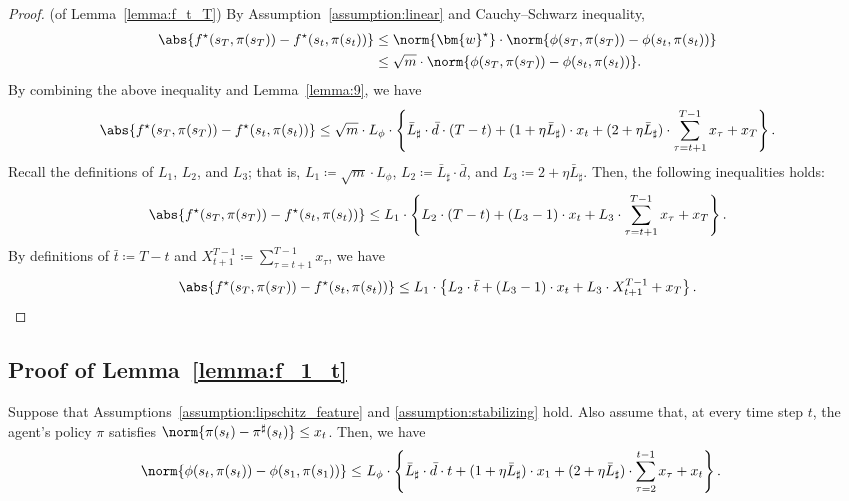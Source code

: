 \smallskip
\begin{proof}(of Lemma~\ref{lemma:f_t_T})
    By Assumption~\ref{assumption:linear} and Cauchy–Schwarz inequality, 
    \begin{align*}
        \abs{f^\star(s_T, \pi(s_T)) - f^\star(s_t, \pi(s_t))} &\le \norm{\bm{w}^\star} \cdot \norm{\phi(s_T, \pi(s_T)) - \phi(s_t, \pi(s_t))} \\
        & \le \sqrt{m} \cdot \norm{\phi(s_T, \pi(s_T)) - \phi(s_t, \pi(s_t))}.
    \end{align*}
    By combining the above inequality and Lemma~\ref{lemma:9}, we have
    \begin{equation*}
        \abs{f^\star(s_T, \pi(s_T)) - f^\star(s_t, \pi(s_t))} \le \sqrt{m} \cdot L_\phi \cdot \left\{\bar{L}_\sharp \cdot \bar{d} \cdot (T-t) + (1 + \eta \bar{L}_\sharp) \cdot x_t + (2 + \eta \bar{L}_\sharp) \cdot \sum_{\tau=t+1}^{T-1} x_\tau + x_{T} \right\}.
    \end{equation*}
    Recall the definitions of $L_1$, $L_2$, and $L_3$; that is, $L_1 \coloneqq \sqrt{m} \cdot L_\phi$, $L_2 \coloneqq \bar{L}_\sharp \cdot \bar{d}$, and $L_3 \coloneqq 2 + \eta \bar{L}_\sharp$. Then, the following inequalities holds:
    \begin{equation*}
        \abs{f^\star(s_T, \pi(s_T)) - f^\star(s_t, \pi(s_t))} \le L_1 \cdot \left\{L_2 \cdot (T-t) + (L_3 - 1) \cdot x_t + L_3 \cdot \sum_{\tau=t+1}^{T-1} x_\tau + x_{T} \right\}.
    \end{equation*}
    By definitions of $\bar{t} \coloneqq T - t$ and $X_{t+1}^{T-1} \coloneqq \sum_{\tau=t+1}^{T-1} x_\tau$, we have
    \begin{equation*}
        \abs{f^\star(s_T, \pi(s_T)) - f^\star(s_t, \pi(s_t))} \le L_1 \cdot \left\{L_2 \cdot \bar{t} + (L_3 - 1) \cdot x_t + L_3 \cdot X_{t+1}^{T-1} + x_{T} \right\}.
    \end{equation*}
\end{proof}

\subsection{Proof of Lemma~\ref{lemma:f_1_t}}
\label{proof:A_3}
\begin{lemma}
    Suppose that Assumptions~\ref{assumption:lipschitz_feature} and \ref{assumption:stabilizing} hold. Also assume that, at every time step $t$, the agent's policy $\pi$ satisfies $\norm{\pi(s_t) - \pi^\sharp(s_t)} \le x_t$. Then, we have
    \begin{align*}
        \norm{\phi(s_t, \pi(s_t)) - \phi(s_1, \pi(s_1))}
        \le &\ L_\phi \cdot \left\{\bar{L}_\sharp \cdot \bar{d} \cdot t + (1 + \eta \bar{L}_\sharp) \cdot x_1 + (2 + \eta \bar{L}_\sharp) \cdot \sum_{\tau=2}^{t-1} x_\tau + x_{t} \right\}.
    \end{align*}
\end{lemma}

